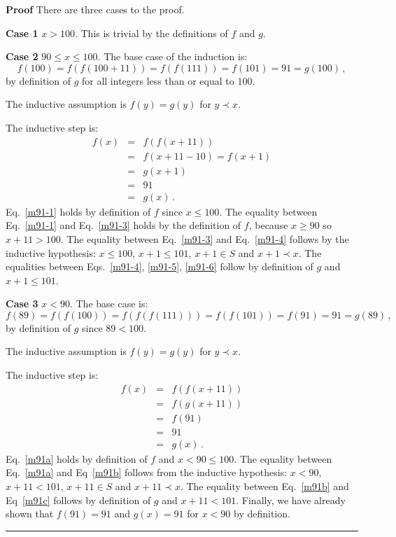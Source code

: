\documentclass[11pt,a4paper]{report}
\newcommand*{\qed}{\hfill\rule{1ex}{1.5ex}}
\begin{document}

\textbf{Proof} There are three cases to the proof.

\textbf{Case 1} $x > 100$. This is trivial by the definitions of $f$ and $g$.

\textbf{Case 2} $90\leq x \leq 100$. The base case of the induction is:
\[
f(100) = f(f(100+11)) = f(f(111)) = f(101) = 91 = g(100)\,,
\]
by definition of $g$ for all integers less than or equal to $100$.

The inductive assumption is $f(y) = g(y)$ for $y\prec x$.

The inductive step is:
\vspace*{-1ex}
\begin{eqnarray}
f(x) &=& f(f(x+11))\label{m91-1}\\
&=& f(x+11-10)= f(x+1)\label{m91-3}\\
&=& g(x+1)\label{m91-4}\\
&=& 91\label{m91-5}\\
&=& g(x)\label{m91-6}\,.
\end{eqnarray}
Eq.~\ref{m91-1} holds by definition of $f$ since $x\leq 100$.
The equality between Eq.~\ref{m91-1} and Eq.~\ref{m91-3} holds by the definition of $f$, because $x \geq 90$ so $x+11 > 100$. The equality between Eq.~\ref{m91-3} and Eq.~\ref{m91-4} follows by the inductive hypothesis: $x\leq 100$, $x+1 \leq 101$, $x+1\in S$ and $x+1\prec x$. The equalities between Eqs.~\ref{m91-4}, \ref{m91-5}, \ref{m91-6} follow by definition of $g$ and $x+1 \leq 101$.

\textbf{Case 3} $x< 90$. The base case is:
\[
f(89) = f(f(100)) = f(f(f(111))) = f(f(101)) = f(91) = 91 = g(89)\,,
\]
by definition of $g$ since $89<100$.

The inductive assumption is $f(y) = g(y)$ for $y\prec x$.

The inductive step is:
\vspace*{-1ex}
\begin{eqnarray}
f(x) &=& f(f(x+11))\label{m91a}\\
&=& f(g(x+11))\label{m91b}\\
&=& f(91)\label{m91c}\\
&=& 91\label{m91d}\\
&=& g(x)\,.
\end{eqnarray}
Eq.~\ref{m91a} holds by definition of $f$ and $x<90\leq 100$.
The equality between Eq.~\ref{m91a} and Eq~\ref{m91b} follows from the inductive hypothesis: $x < 90$, $x+11< 101$, $x+11\in S$ and $x+11 \prec x$. The equality between Eq.~\ref{m91b} and Eq~\ref{m91c} follows by definition of $g$ and $x+11 < 101$. Finally, we have already shown that $f(91)=91$ and $g(x)=91$ for $x<90$ by definition.\qed
\end{document}
